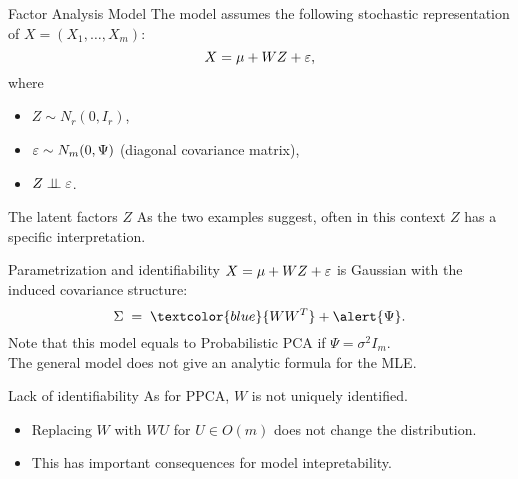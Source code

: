 \documentclass[11pt,handout,aspectratio=169]{beamer}
\begin{document}
\begin{frame}{Factor Analysis Model}
The model assumes the following stochastic representation of $X=(X_1,\ldots,X_m)$:
\[ X = \mu + WZ + \varepsilon, \]
where
        \begin{itemize}
            \item $Z \sim N_r(0, I_r)$,
            \item $\varepsilon \sim N_m(0, \Psi)$ (diagonal covariance matrix),
            \item $Z\perp\!\!\! \perp \varepsilon$.
        \end{itemize}
        \bigskip 
        \begin{block}{The latent factors $Z$}
        	As the two examples suggest, often in this context $Z$ has a specific interpretation.
        \end{block}
\end{frame}

\begin{frame}{Parametrization and identifiability}
	$X=\mu+WZ+\varepsilon$ is Gaussian with the induced covariance structure: \[ \Sigma \;=\; \textcolor{blue}{WW^T} + \alert{\Psi}. \]
	Note that this model equals to Probabilistic PCA if $\Psi=\sigma^2I_m$.\\[4mm]
	The general model does not give an analytic formula for the MLE. \\[4mm]
\begin{alertblock}{Lack of identifiability}
	As for PPCA, $W$ is not uniquely identified.
	\begin{itemize}
		\item Replacing $W$ with $WU$ for $U\in O(m)$ does not change the distribution.
		\item This has important consequences for model intepretability.
	\end{itemize}
\end{alertblock}
\end{frame}
\end{document}
